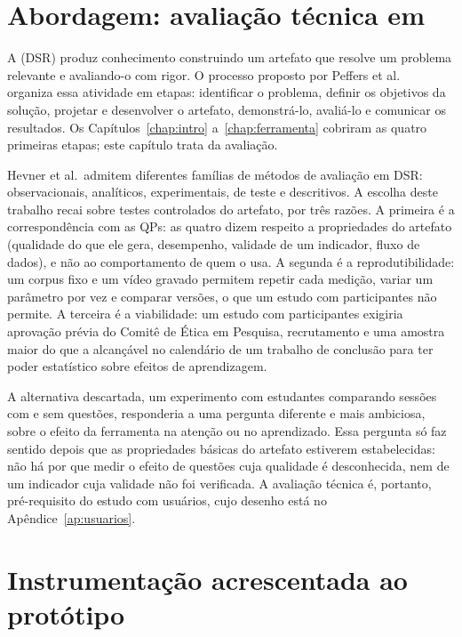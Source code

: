\section{\label{sec:abordagem}Abordagem: avaliação técnica em }

A  (DSR) produz conhecimento construindo um artefato que resolve um problema relevante e avaliando-o com rigor. O processo proposto por Peffers et al.\ \cite{PTR07} organiza essa atividade em etapas: identificar o problema, definir os objetivos da solução, projetar e desenvolver o artefato, demonstrá-lo, avaliá-lo e comunicar os resultados. Os Capítulos~\ref{chap:intro} a~\ref{chap:ferramenta} cobriram as quatro primeiras etapas; este capítulo trata da avaliação.

Hevner et al.\ admitem diferentes famílias de métodos de avaliação em DSR: observacionais, analíticos, experimentais, de teste e descritivos. A escolha deste trabalho recai sobre testes controlados do artefato, por três razões. A primeira é a correspondência com as QPs: as quatro dizem respeito a propriedades do artefato (qualidade do que ele gera, desempenho, validade de um indicador, fluxo de dados), e não ao comportamento de quem o usa. A segunda é a reprodutibilidade: um corpus fixo e um vídeo gravado permitem repetir cada medição, variar um parâmetro por vez e comparar versões, o que um estudo com participantes não permite. A terceira é a viabilidade: um estudo com participantes exigiria aprovação prévia do Comitê de Ética em Pesquisa, recrutamento e uma amostra maior do que a alcançável no calendário de um trabalho de conclusão para ter poder estatístico sobre efeitos de aprendizagem.

A alternativa descartada, um experimento com estudantes comparando sessões com e sem questões, responderia a uma pergunta diferente e mais ambiciosa, sobre o efeito da ferramenta na atenção ou no aprendizado. Essa pergunta só faz sentido depois que as propriedades básicas do artefato estiverem estabelecidas: não há por que medir o efeito de questões cuja qualidade é desconhecida, nem de um indicador cuja validade não foi verificada. A avaliação técnica é, portanto, pré-requisito do estudo com usuários, cujo desenho está no Apêndice~\ref{ap:usuarios}.

\section{\label{sec:instrumentacao}Instrumentação acrescentada ao protótipo}

